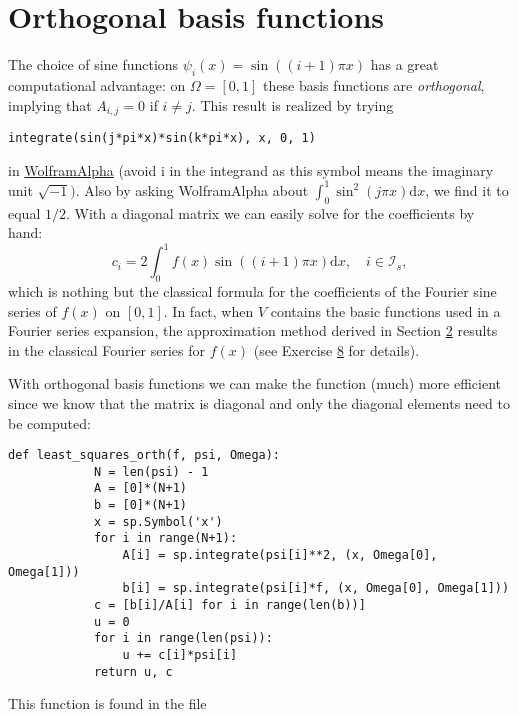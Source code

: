 \documentclass[../main.tex]{subfiles}
\begin{document}
	\section[Orthogonal basis functions]{Orthogonal basis functions}
	\label{sec:sec_2_8}
	The choice of sine functions $\psi_{i}(x)=\sin ((i+1) \pi x)$ has a great computational advantage: on $\Omega=[0,1]$ these basis functions are \textit{orthogonal}, implying that $A_{i, j}=0$ if $i \neq j$. This result is realized by trying
	\begin{lstlisting}[numbers=none]
		integrate(sin(j*pi*x)*sin(k*pi*x), x, 0, 1)
	\end{lstlisting}
	in \href{https://www.wolframalpha.com/}{WolframAlpha} (avoid i in the integrand as this symbol means the imaginary unit $\sqrt{-1})$. Also by asking WolframAlpha about $\int_{0}^{1} \sin ^{2}(j \pi x) \mathrm{d} x$, we find it to equal $1 / 2$. With a diagonal matrix we can easily solve for the coefficients by hand:
	\begin{equation}\label{eqa41}
		c_{i}=2 \int_{0}^{1} f(x) \sin ((i+1) \pi x) \mathrm{d} x, \quad i \in \mathcal{I}_{s},
	\end{equation}
	which is nothing but the classical formula for the coefficients of the Fourier sine series of $f(x)$ on $[0,1]$. In fact, when \textit{$V$} contains the basic functions used in a Fourier series expansion, the approximation method derived in Section \hyperref[chap:chap_2]{2} results in the classical Fourier series for $f(x)$ (see Exercise \hyperref[sec:sec_10_8]{8} for details).
	
	With orthogonal basis functions we can make the  function (much) more efficient since we know that the matrix is diagonal and only the diagonal elements need to be computed:
	\begin{lstlisting}[numbers=none]
		def least_squares_orth(f, psi, Omega):
			N = len(psi) - 1
			A = [0]*(N+1)
			b = [0]*(N+1)
			x = sp.Symbol('x')
			for i in range(N+1):
				A[i] = sp.integrate(psi[i]**2, (x, Omega[0], Omega[1]))
				b[i] = sp.integrate(psi[i]*f, (x, Omega[0], Omega[1]))
			c = [b[i]/A[i] for i in range(len(b))]
			u = 0
			for i in range(len(psi)):
				u += c[i]*psi[i]
			return u, c
	\end{lstlisting}
	This function is found in the file 
\end{document}
